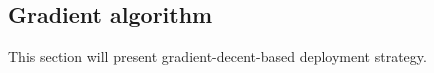 \documentclass[letterpaper, 10 pt, conference]{ieeeconf}
\begin{document}
\subsection{Gradient algorithm}
This section will present gradient-decent-based deployment strategy.
%
%
\end{document}
